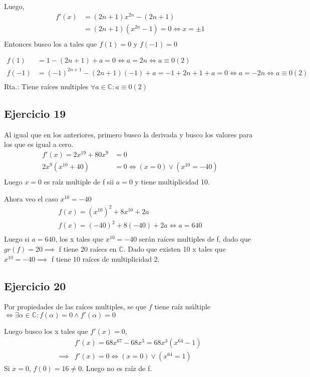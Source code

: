 Luego,
\begin{align*}
    f'(x) &= (2n+1)x^{2n} - (2n+1) \\
    &= (2n+1)(x^{2n} - 1) = 0 \iff x = \pm 1 \\
\end{align*}
Entonces busco los a tales que $f(1) = 0$ y $f(-1) = 0$

\begin{align*}
    f(1) &= 1-(2n+1) +a = 0 \iff a = 2n \iff a \equiv 0(2)\\
    f(-1) &= (-1)^{2n+1}-(2n+1)(-1) +a = -1+2n+1+a = 0 \iff a = -2n \iff a \equiv 0(2) \\
\end{align*}
Rta.: Tiene raíces multiples $ \forall a \in \mathbb{C}: a \equiv 0(2) $

\subsection{Ejercicio 19}
Al igual que en los anteriores, primero busco la derivada y busco los valores para los que es igual a cero.
\begin{align*}
    f'(x) = 2x^{19} + 80x^9 &= 0 \\
    2x^{9}(x^{10} + 40) &= 0 \iff (x = 0) \vee (x^{10} = -40) \\
\end{align*}
Luego $ x = 0 $ es raíz multiple de f sii $a = 0$ y tiene multiplicidad 10.

Ahora veo el caso $ x^{10} = -40 $
\begin{align*}
    f(x) = (x^{10})^2 +8x^{10} + 2a \\
    f(x) = (-40)^2 +8(-40) + 2a \iff a = 640 \\
\end{align*}
Luego si $ a = 640 $, los x tales que $ x^{10} = -40 $ serán raíces multiples de f, dado que $gr(f) = 20 \implies $ f tiene 20 raíecs en $\mathbb{C}$. Dado que existen 10 x tales que $x^{10} = -40 \implies $ f tiene 10 raíces de multiplicidad 2.  

\subsection{Ejercicio 20}
Por propiedades de las raíces multiples, se que $f$ tiene raíz múltiple $ \iff \exists \alpha \in \mathbb{C}: f(\alpha) = 0 \wedge f'(\alpha) = 0 $

Luego busco los x tales que $f'(x) = 0$,
\begin{align*}
    &f'(x) = 68x^{67} - 68x^{3} = 68x^3(x^{64}-1) \\
    \implies &f'(x) = 0 \iff (x=0) \vee (x^{64}=1)
\end{align*}
Si $x=0$, $ f(0) = 16 \neq 0 $. Luego no es raíz de f.

